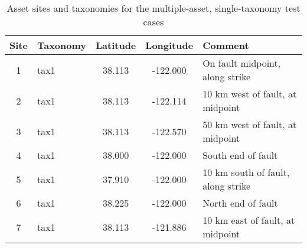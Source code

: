 \begin{table}

\centering
\begin{tabular}{ c l c c l }

\hline
\rowcolor{anti-flashwhite}
\bf{Site} & \bf{Taxonomy} & \bf{Latitude} & \bf{Longitude} & \bf{Comment} \\
\hline
1 & tax1 & 38.113 & -122.000 & On fault midpoint, along strike \\
2 & tax1 & 38.113 & -122.114 & 10 km west of fault, at midpoint \\
3 & tax1 & 38.113 & -122.570 & 50 km west of fault, at midpoint \\
4 & tax1 & 38.000 & -122.000 & South end of fault \\
5 & tax1 & 37.910 & -122.000 & 10 km south of fault, along strike \\
6 & tax1 & 38.225 & -122.000 & North end of fault \\
7 & tax1 & 38.113 & -121.886 & 10 km east of fault, at midpoint \\
\hline
\end{tabular}

\caption{Asset sites and taxonomies for the multiple-asset, single-taxonomy test cases}
\label{tab:assets-tax1}
\end{table}
